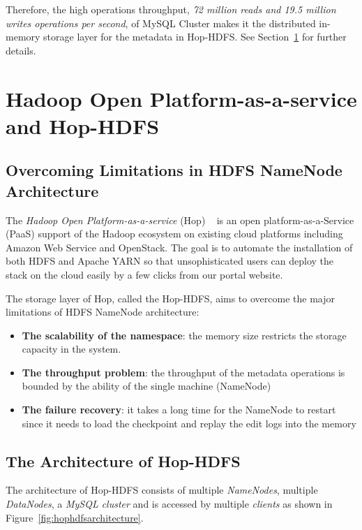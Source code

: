 \noindent Therefore, the high operations throughput, \textit{72 million reads and 19.5 million writes operations per second}, of MySQL Cluster makes it the distributed in-memory storage layer for the metadata in Hop-HDFS. See Section~\ref{sc:Hop-HDFS} for further details.

\section{Hadoop Open Platform-as-a-service and Hop-HDFS}
\label{sc:Hop-HDFS}
\subsection{Overcoming Limitations in HDFS NameNode Architecture}
The \textit{Hadoop Open Platform-as-a-service} (Hop) ~\cite{hop} is an open platform-as-a-Service (PaaS) support of the Hadoop ecosystem on existing cloud platforms including Amazon Web Service and OpenStack. The goal is to automate the installation of both HDFS and Apache YARN so that unsophisticated users can deploy the stack on the cloud easily by a few clicks from our portal website. 

\noindent The storage layer of Hop, called the Hop-HDFS, aims to overcome the major limitations of HDFS NameNode architecture:

\begin{itemize}[noitemsep]
	\item \textbf{The scalability of the namespace}: the memory size restricts the storage capacity in the system.
	\item \textbf{The throughput problem}: the throughput of the metadata operations is bounded by the ability of the single machine (NameNode)
	\item \textbf{The failure recovery}: it takes a long time for the NameNode to restart since it needs to load the checkpoint and replay the edit logs into the memory
\end{itemize}

\subsection{The Architecture of Hop-HDFS}

\noindent The architecture of Hop-HDFS consists of multiple \textit{NameNodes}, multiple \textit{DataNodes}, a \textit{MySQL cluster} and is accessed by multiple \textit{clients} as shown in Figure~\ref{fig:hophdfsarchitecture}.

